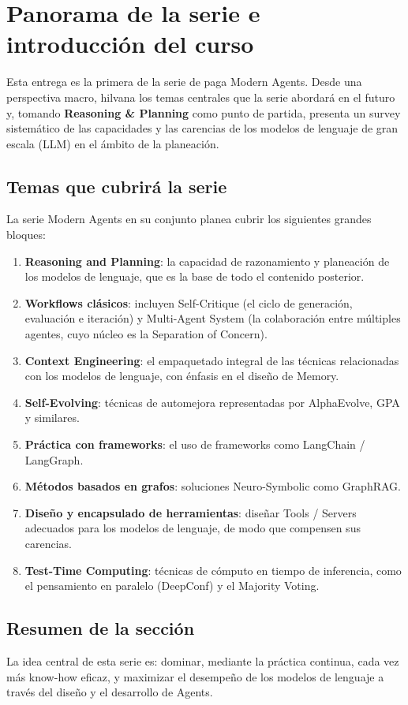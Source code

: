 \section{Panorama de la serie e introducción del curso}

Esta entrega es la primera de la serie de paga Modern Agents. Desde una perspectiva macro, hilvana los temas centrales que la serie abordará en el futuro y, tomando \textbf{Reasoning \& Planning} como punto de partida, presenta un survey sistemático de las capacidades y las carencias de los modelos de lenguaje de gran escala (LLM) en el ámbito de la planeación.

\subsection{Temas que cubrirá la serie}

La serie Modern Agents en su conjunto planea cubrir los siguientes grandes bloques:

\begin{enumerate}
    \item \textbf{Reasoning and Planning}: la capacidad de razonamiento y planeación de los modelos de lenguaje, que es la base de todo el contenido posterior.
    \item \textbf{Workflows clásicos}: incluyen Self-Critique (el ciclo de generación, evaluación e iteración) y Multi-Agent System (la colaboración entre múltiples agentes, cuyo núcleo es la Separation of Concern).
    \item \textbf{Context Engineering}: el empaquetado integral de las técnicas relacionadas con los modelos de lenguaje, con énfasis en el diseño de Memory.
    \item \textbf{Self-Evolving}: técnicas de automejora representadas por AlphaEvolve, GPA y similares.
    \item \textbf{Práctica con frameworks}: el uso de frameworks como LangChain / LangGraph.
    \item \textbf{Métodos basados en grafos}: soluciones Neuro-Symbolic como GraphRAG.
    \item \textbf{Diseño y encapsulado de herramientas}: diseñar Tools / Servers adecuados para los modelos de lenguaje, de modo que compensen sus carencias.
    \item \textbf{Test-Time Computing}: técnicas de cómputo en tiempo de inferencia, como el pensamiento en paralelo (DeepConf) y el Majority Voting.
\end{enumerate}

\subsection{Resumen de la sección}

La idea central de esta serie es: dominar, mediante la práctica continua, cada vez más know-how eficaz, y maximizar el desempeño de los modelos de lenguaje a través del diseño y el desarrollo de Agents.

